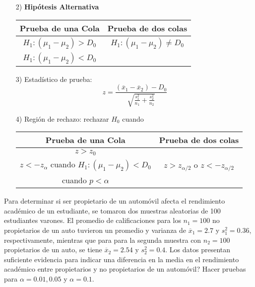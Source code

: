 \begin{frame}
\begin{frame}
\begin{itemize}
donde $D_{0}$ es el valor, la diferencia, espec\'ifico que se desea probar. En algunos casos se querr\'a demostrar que no hay diferencia alguna, es decir $D_{0}=0$.

\item[2) ] \textbf{Hip\'otesis Alternativa}
\begin{tabular}{cc}\hline
\textbf{Prueba de una Cola} & \textbf{Prueba de dos colas}\\\hline
$H_{1}:\left(\mu_{1}-\mu_{2}\right)>D_{0}$ & $H_{1}:\left(\mu_{1}-\mu_{2}\right)\neq D_{0}$\\ 
$H_{1}:\left(\mu_{1}-\mu_{2}\right)<D_{0}$&\\
\end{tabular}

\end{itemize}








\begin{itemize}
\item[3) ] Estad\'istico de prueba:
$$z=\frac{\left(\overline{x}_{1}-\overline{x}_{2}\right)-D_{0}}{\sqrt{\frac{s^{2}_{1}}{n_{1}}+\frac{s^{2}_{2}}{n_{2}}}}$$
\item[4) ] Regi\'on de rechazo: rechazar $H_{0}$ cuando
\begin{tabular}{cc}\hline
\textbf{Prueba de una Cola} & \textbf{Prueba de dos colas}\\\hline
$z>z_{0}$ & \\
$z<-z_{\alpha}$ cuando $H_{1}:\left(\mu_{1}-\mu_{2}\right)<D_{0}$&$z>z_{\alpha/2}$ o $z<-z_{\alpha/2}$\\
 cuando $p<\alpha$&\\
\end{tabular}


\end{itemize}









\begin{Ejem}
Para determinar si ser propietario de un autom\'ovil afecta el rendimiento acad\'emico de un estudiante, se tomaron dos muestras aleatorias de 100 estudiantes varones. El promedio de calificaciones para los $n_{1}=100$ no propietarios de un auto tuvieron un promedio y varianza de $\overline{x}_{1}=2.7$ y $s_{1}^{2}=0.36$, respectivamente, mientras que para para la segunda muestra con $n_{2}=100$ propietarios de un auto, se tiene $\overline{x}_{2}=2.54$ y $s_{2}^{2}=0.4$. Los datos presentan suficiente evidencia para indicar una diferencia en la media en el rendimiento acad\'emico entre propietarios y no propietarios de un autom\'ovil? Hacer pruebas para $\alpha=0.01,0.05$ y $\alpha=0.1$.
\end{Ejem}








\end{frame}
\end{frame}
